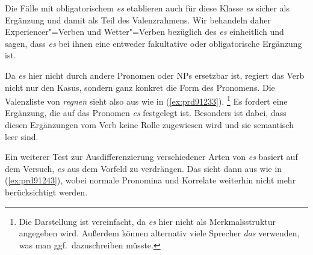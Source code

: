 \begin{exe}
  \ex\label{ex:prde0001} 
  \begin{xlist}
  \end{xlist}
\end{exe}

Die Fälle mit obligatorischem \textit{es} etablieren auch für diese Klasse \textit{es} sicher als Ergänzung und damit als Teil des Valenzrahmens.
Wir behandeln daher Experiencer"=Verben und Wetter"=Verben bezüglich des \textit{es} einheitlich und sagen, dass \textit{es} bei ihnen eine entweder fakultative oder obligatorische Ergänzung ist.

Da \textit{es} hier nicht durch andere Pronomen oder NPs ersetzbar ist, regiert das Verb nicht nur den Kasus, sondern ganz konkret die Form des Pronomens.
Die Valenzliste von \textit{regnen} sieht also aus wie in (\ref{ex:prd91233}).%
\footnote{Die Darstellung ist vereinfacht, da \textit{es} hier nicht als Merkmalsstruktur angegeben wird.
Außerdem können alternativ viele Sprecher \textit{das} verwenden, was man ggf.\ dazuschreiben müsste.}
Es fordert eine Ergänzung, die auf das Pronomen \textit{es} festgelegt ist.
Besonders ist dabei, dass diesen Ergänzungen vom Verb keine Rolle zugewiesen wird und sie semantisch leer sind.

\begin{exe}
\end{exe}

Ein weiterer Test zur Ausdifferenzierung verschiedener Arten von \textit{es} basiert auf dem Versuch, \textit{es} aus dem Vorfeld zu verdrängen.
Das sieht dann aus wie in (\ref{ex:prd91243}), wobei normale Pronomina und Korrelate weiterhin nicht mehr berücksichtigt werden.

\begin{exe}
  \ex\label{ex:prd91243}
  \begin{xlist}
  \end{xlist}
\end{exe}

